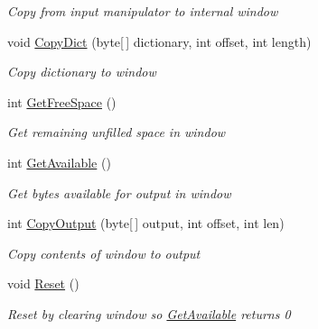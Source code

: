 \begin{DoxyCompactItemize}
\begin{DoxyCompactList}\small\item\em Copy from input manipulator to internal window \end{DoxyCompactList}\item 
void \hyperlink{class_i_c_sharp_code_1_1_sharp_zip_lib_1_1_zip_1_1_compression_1_1_streams_1_1_output_window_a2d169e228a99a67262fa9c6ce549e251}{Copy\+Dict} (byte\mbox{[}$\,$\mbox{]} dictionary, int offset, int length)
\begin{DoxyCompactList}\small\item\em Copy dictionary to window \end{DoxyCompactList}\item 
int \hyperlink{class_i_c_sharp_code_1_1_sharp_zip_lib_1_1_zip_1_1_compression_1_1_streams_1_1_output_window_af9e1b4ad75dfa1aa878fc6daa8a3d5e3}{Get\+Free\+Space} ()
\begin{DoxyCompactList}\small\item\em Get remaining unfilled space in window \end{DoxyCompactList}\item 
int \hyperlink{class_i_c_sharp_code_1_1_sharp_zip_lib_1_1_zip_1_1_compression_1_1_streams_1_1_output_window_a1ae7b10eae496ec980847ad1b89fa689}{Get\+Available} ()
\begin{DoxyCompactList}\small\item\em Get bytes available for output in window \end{DoxyCompactList}\item 
int \hyperlink{class_i_c_sharp_code_1_1_sharp_zip_lib_1_1_zip_1_1_compression_1_1_streams_1_1_output_window_a2ed1c8e829e63d30e72ddbd18cbc75dc}{Copy\+Output} (byte\mbox{[}$\,$\mbox{]} output, int offset, int len)
\begin{DoxyCompactList}\small\item\em Copy contents of window to output \end{DoxyCompactList}\item 
void \hyperlink{class_i_c_sharp_code_1_1_sharp_zip_lib_1_1_zip_1_1_compression_1_1_streams_1_1_output_window_af69f36602755df59247e2b16b77b0cd5}{Reset} ()
\begin{DoxyCompactList}\small\item\em Reset by clearing window so \hyperlink{class_i_c_sharp_code_1_1_sharp_zip_lib_1_1_zip_1_1_compression_1_1_streams_1_1_output_window_a1ae7b10eae496ec980847ad1b89fa689}{Get\+Available} returns 0 \end{DoxyCompactList}\end{DoxyCompactItemize}


